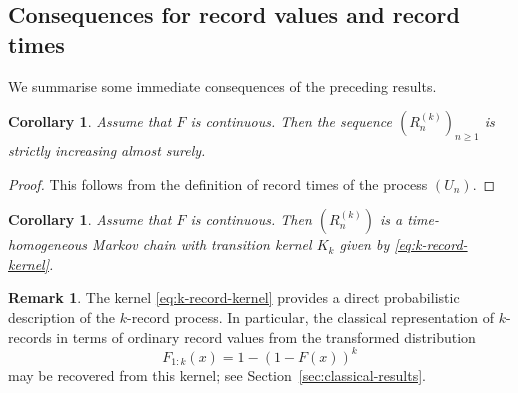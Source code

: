 \documentclass[12pt]{article}
\newtheorem{corollary}[theorem]{Corollary}
\theoremstyle{definition}
\newtheorem{remark}[theorem]{Remark}
\begin{document}
\subsection{Consequences for record values and record times}
\label{subsec:consequences}

We summarise some immediate consequences of the preceding results.

\begin{corollary}
\label{cor:strict-increase}
Assume that $F$ is continuous. Then the sequence $(R_n^{(k)})_{n\ge1}$ is strictly increasing almost surely.
\end{corollary}

\begin{proof}
This follows from the definition of record times of the process $(U_n)$.
\end{proof}

\medskip

\begin{corollary}
\label{cor:markov-property-records}
Assume that $F$ is continuous. Then $(R_n^{(k)})$ is a time-homogeneous Markov chain with transition kernel $K_k$ given by \eqref{eq:k-record-kernel}.
\end{corollary}

\medskip

\begin{remark}
\label{rem:connection-literature}
The kernel \eqref{eq:k-record-kernel} provides a direct probabilistic description of the $k$-record process. In particular, the classical representation of $k$-records in terms of ordinary record values from the transformed distribution
\[
F_{1:k}(x)=1-(1-F(x))^k
\]
may be recovered from this kernel; see Section~\ref{sec:classical-results}.
\end{remark}


%
\end{document}
